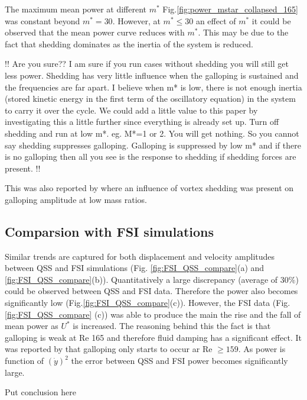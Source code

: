  

The maximum mean power at different $m^*$ Fig.\ref{fig:power_mstar_collapsed_165} was constant beyond $m^*=30$. However, at $m^* \leq 30$ an effect of $m^*$ it could be observed that the mean power curve reduces with $m^*$. This may be due to the fact that shedding dominates as the inertia of the system is reduced.  

!! Are you sure?? I am sure if you run cases without shedding you will still get less power. Shedding has very little influence when the galloping is sustained and the frequencies are far apart. I believe when m* is low, there is not enough inertia (stored kinetic energy in the first term of the oscillatory equation)  in the system to carry it over the cycle.
We could add a little value to this paper by investigating this a little further since everything is already set up. Turn off shedding and run at low m*. eg. M*=1 or 2. You will get nothing. So you cannot say shedding suppresses galloping. Galloping is suppressed by low m* and if there is no galloping then all you see is the response to shedding if shedding forces are present.
 !! 
 
 This was also reported by \cite{Joly2012} where an influence of vortex shedding was present on galloping amplitude at low mass ratios. 



 

\subsection{Comparsion with FSI simulations}
 Similar trends are captured for both displacement and velocity amplitudes between QSS and FSI simulations (Fig. \ref{fig:FSI_QSS_compare}(a) and \ref{fig:FSI_QSS_compare}(b)). Quantitatively a large discrepancy (average of $30\%$) could be observed between QSS and FSI data. Therefore the power also becomes significantly low (Fig.\ref{fig:FSI_QSS_compare}(c)). However, the FSI data (Fig.\ref{fig:FSI_QSS_compare} (c)) was able to produce the main the rise and the fall of mean power as $U^*$ is increased. The reasoning behind this the fact is that galloping is weak at Re 165  and therefore fluid damping has a significant effect. It was reported by \cite{Barrero-Gil2009} that galloping only starts to occur ar Re $\geq 159$. As power is function of $(\dot{y})^2$ the error between QSS and FSI power becomes significantly large.  
 
 Put conclusion here 
 
 










 

 
 
 

 
 



 
 
 
 
 
 
 
 
 
 
  
 
 